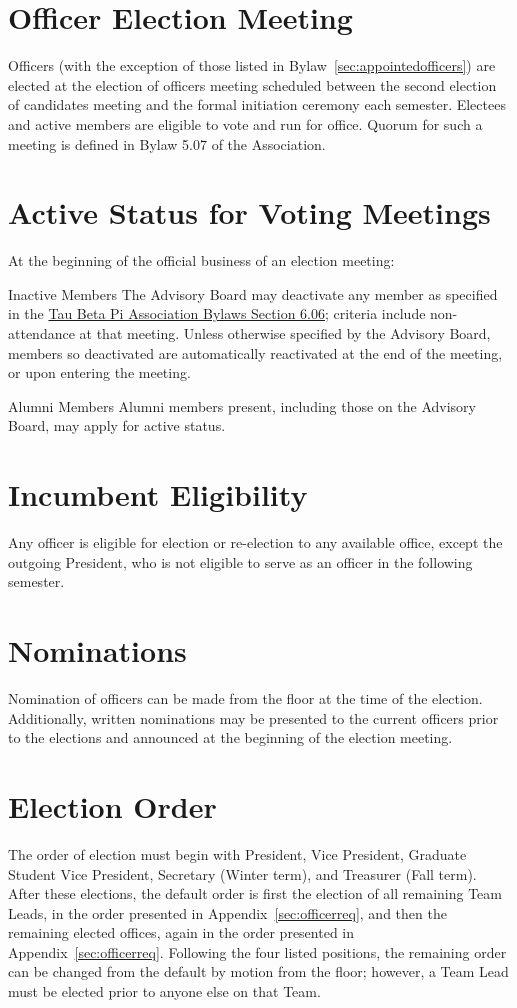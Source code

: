 \section{Officer Election Meeting}\label{sec:elecMeeting} Officers (with the exception of those listed in Bylaw~\ref{sec:appointedofficers}) are elected at the election 
of officers meeting scheduled between the second election of candidates meeting and the formal initiation ceremony each semester. Electees and active members are eligible to vote and run for office. Quorum for such a meeting is defined in Bylaw 5.07 of the Association.
\section{Active Status for Voting Meetings}\label{sec:elecQuorum} At the beginning of the official business of an election meeting:
\begin{enumsubsection}
\item*{Inactive Members} The Advisory Board may deactivate any member as specified in the  \href{http://www.tbp.org/off/ConstBylaw.pdf}{Tau Beta Pi Association Bylaws Section 6.06}; criteria include non-attendance at that meeting. Unless otherwise specified by the Advisory Board,
members so deactivated are automatically reactivated at the end of the meeting, or upon entering the meeting.
\item*{Alumni Members} Alumni members present, including those on the Advisory Board, may apply for active status.
\end{enumsubsection}
\section{Incumbent Eligibility} Any officer is eligible for election or re-election to any available office, except the outgoing President, who is not eligible to serve as an officer in the following semester.
\section{Nominations} Nomination of officers can be made from the floor at the time of the election.  Additionally, written nominations may be presented to the current officers prior to the elections and announced at the beginning of the election meeting.
\section{Election Order} The order of election must begin with President, Vice President, Graduate Student Vice President, Secretary (Winter term), and Treasurer (Fall term). After these elections, the default order is first the election of all remaining Team Leads, in the order presented in Appendix~\ref{sec:officerreq}, and then the remaining elected offices, again in the order presented in Appendix~\ref{sec:officerreq}. Following the four listed positions, the remaining order can be changed from the default by motion from the floor; however, a Team Lead must be elected prior to anyone else on that Team.
